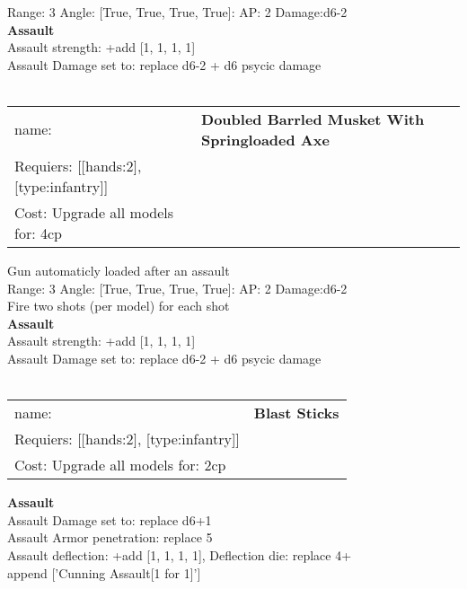 Range: 3  Angle: [True, True, True, True]: AP: 2 Damage:d6-2 \\



{\bf Assault} \ \\
Assault strength: +add [1, 1, 1, 1] 
\\ 
Assault Damage set to: replace d6-2 + d6 psycic damage
\\ 




\ \\
\begin{tabular}{ll}
name: & {\bf Doubled Barrled Musket With Springloaded Axe } \\
Requiers: [[hands:2], [type:infantry]] \\
Cost: Upgrade all models for: 4cp \\
\end{tabular}

Gun automaticly loaded after an assault\\ 


Range: 3  Angle: [True, True, True, True]: AP: 2 Damage:d6-2 \\
Fire two shots (per model) for each shot\\ 



{\bf Assault} \ \\
Assault strength: +add [1, 1, 1, 1] 
\\ 
Assault Damage set to: replace d6-2 + d6 psycic damage
\\ 




\ \\
\begin{tabular}{ll}
name: & {\bf Blast Sticks } \\
Requiers: [[hands:2], [type:infantry]] \\
Cost: Upgrade all models for: 2cp \\
\end{tabular}





{\bf Assault} \ \\
Assault Damage set to: replace d6+1
\\ 
Assault Armor penetration: replace 5 
\\ 
Assault deflection: +add [1, 1, 1, 1], Deflection die: replace 4+
\\ 

append ['Cunning Assault[1 for 1]']


